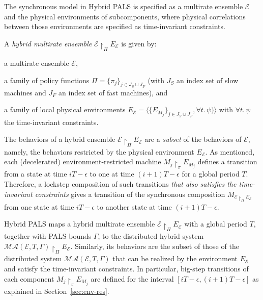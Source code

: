 The synchronous model in Hybrid PALS is specified
as a multirate ensemble $\mathcal{E}$ and  the physical environments of subcomponents,
where physical correlations between those environments
are specified as time-invariant constraints.

\begin{definition}
A \emph{hybrid multirate ensemble} $\mathcal{E}\restriction_{\Pi} E_{\mathcal{E}}$
is given by:
\begin{inparaenum}[(i)]
    \item a multirate ensemble $\mathcal{E}$, %
    \item a family of policy functions $\Pi=\{\pi_j\}_{j\in J_S  \cup J_F}$
    (with $J_S$ an index set of slow machines and $J_F$ an index set of fast machines),
    and
    \item a family of local physical environments 
    $E_\mathcal{E} = \langle\{E_{M_j}\}_{j\in J_S \cup J_F}, \forall t.\, \psi)\rangle$ 
    with $\forall t.\,\psi$ the time-invariant constraints.
\end{inparaenum}
\end{definition}   


The behaviors of a hybrid ensemble  $\mathcal{E} \restriction_{\Pi} E_\mathcal{E}$
are  a \emph{subset} of the behaviors of $\mathcal{E}$, namely, the behaviors restricted by 
the physical environment $E_\mathcal{E}$.
As mentioned,
each (decelerated) environment-restricted machine $M_j \restriction_\pi E_{M_j}$ defines 
a transition from a state  at time $iT - \epsilon$ to one at time $(i+1)T-\epsilon$ for a global period $T$.
Therefore, a lockstep composition of such %
transitions
\emph{that also satisfies the time-invariant constraints} gives a transition of 
the synchronous composition $M_{\mathcal{E} \restriction_{\Pi} E_\mathcal{E}}$
from one state at time $iT - \epsilon$ to another state at time $(i+1)T-\epsilon$.


Hybrid PALS maps a hybrid multirate ensemble
$\mathcal{E}\restriction_{\Pi} E_\mathcal{E}$ with a global period $T$, 
together with PALS bounds $\Gamma$,  to the distributed hybrid system  
$\mathcal{MA}(\mathcal{E}, T, \Gamma) \restriction_{\Pi} E_\mathcal{E}$.
Similarly, its  behaviors are the subset of those of the %
distributed system $\mathcal{MA}(\mathcal{E}, T, \Gamma)$ that can be realized
by the %
environment $E_\mathcal{E}$
and satisfy the time-invariant constraints.
In particular, big-step transitions of each component $M_j \restriction_\pi E_{M_j}$ are
defined for the interval $[iT - \epsilon, (i+1)T-\epsilon]$
 as explained in Section~\ref{sec:env-res}.


